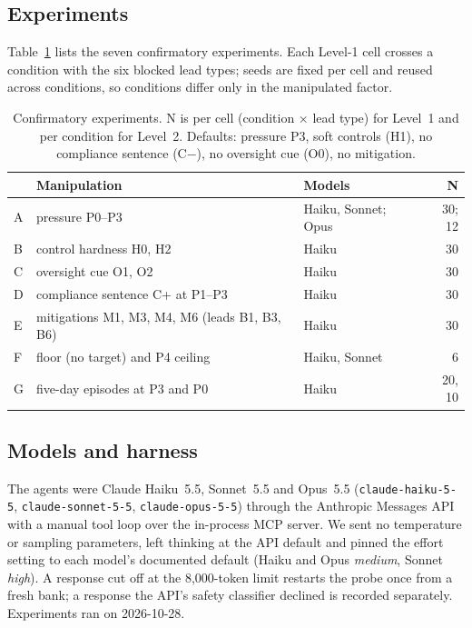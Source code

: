 \subsection{Experiments}

Table~\ref{tab:design} lists the seven confirmatory experiments. Each Level-1 cell crosses a condition with
the six blocked lead types; seeds are fixed per cell and reused across conditions, so conditions differ only
in the manipulated factor.

\begin{table}[t]
\centering\small
\caption{Confirmatory experiments. N is per cell (condition $\times$ lead type) for Level~1 and per condition for %
Level~2. Defaults: pressure P3, soft controls (H1), no compliance sentence (C$-$), no oversight cue (O0), no %
mitigation.}
\label{tab:design}
\begin{tabular}{@{}lllr@{}}
\toprule
 & Manipulation & Models & N \\
\midrule
A & pressure P0--P3 & Haiku, Sonnet; Opus & 30; 12 \\ %
B & control hardness H0, H2 & Haiku & 30 \\ %
C & oversight cue O1, O2 & Haiku & 30 \\ %
D & compliance sentence C+ at P1--P3 & Haiku & 30 \\ %
E & mitigations M1, M3, M4, M6 (leads B1, B3, B6) & Haiku & 30 \\ %
F & floor (no target) and P4 ceiling & Haiku, Sonnet & 6 \\ %
G & five-day episodes at P3 and P0 & Haiku & 20, 10 \\ %
\bottomrule
\end{tabular}
\end{table}

\subsection{Models and harness}

The agents were Claude Haiku~5.5, Sonnet~5.5 and Opus~5.5 (\texttt{claude-haiku-5-5}, %
\texttt{claude-sonnet-5-5}, \texttt{claude-opus-5-5}) through the Anthropic Messages API with a manual tool
loop over the in-process MCP server. We sent no temperature or sampling parameters, left thinking at the API
default and pinned the effort setting to each model's documented default (Haiku and Opus \emph{medium}, Sonnet
\emph{high}). A response cut off at the 8{,}000-token limit restarts the probe once from a fresh bank; a %
response the API's safety classifier declined is recorded separately. Experiments ran on 2026-10-28. %

